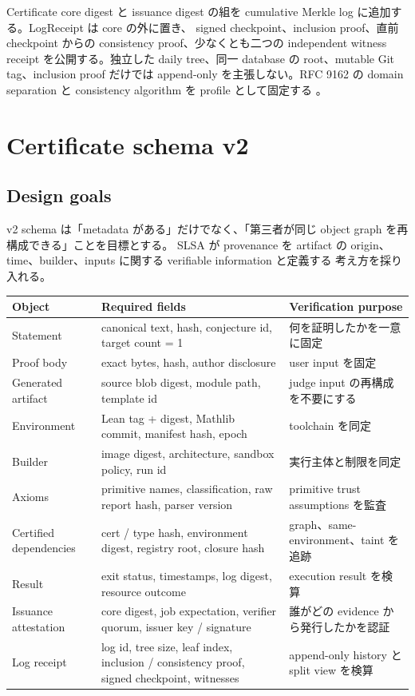 \documentclass[a4paper,11pt]{ltjsarticle}
\begin{document}
Certificate core digest と issuance digest の組を cumulative Merkle log に追加する。LogReceipt は core の外に置き、
signed checkpoint、inclusion proof、直前 checkpoint からの consistency proof、少なくとも二つの independent witness
receipt を公開する。独立した daily tree、同一 database の root、mutable Git tag、inclusion proof だけでは append-only
を主張しない。RFC 9162 の domain separation と consistency algorithm を profile として固定する
\cite{rfc9162}。

\section{Certificate schema v2}

\subsection{Design goals}

v2 schema は「metadata がある」だけでなく、「第三者が同じ object graph を再構成できる」ことを目標とする。
SLSA が provenance を artifact の origin、time、builder、inputs に関する verifiable information と定義する
考え方を採り入れる\cite{slsa}。

\begin{tabularx}{0.96\linewidth}{L{37mm}YY}
\toprule
\textbf{Object} & \textbf{Required fields} & \textbf{Verification purpose} \\
\midrule
Statement & canonical text, hash, conjecture id, target count = 1 & 何を証明したかを一意に固定 \\
Proof body & exact bytes, hash, author disclosure & user input を固定 \\
Generated artifact & source blob digest, module path, template id & judge input の再構成を不要にする \\
Environment & Lean tag + digest, Mathlib commit, manifest hash, epoch & toolchain を同定 \\
Builder & image digest, architecture, sandbox policy, run id & 実行主体と制限を同定 \\
Axioms & primitive names, classification, raw report hash, parser version & primitive trust assumptions を監査 \\
Certified dependencies & cert / type hash, environment digest, registry root, closure hash & graph、same-environment、taint を追跡 \\
Result & exit status, timestamps, log digest, resource outcome & execution result を検算 \\
Issuance attestation & core digest, job expectation, verifier quorum, issuer key / signature & 誰がどの evidence から発行したかを認証 \\
Log receipt & log id, tree size, leaf index, inclusion / consistency proof, signed checkpoint, witnesses & append-only history と split view を検算 \\
\bottomrule
\end{tabularx}
\end{document}
